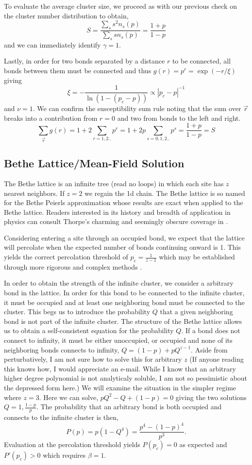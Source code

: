 To evaluate the average cluster size, we proceed as with our previous check on
the cluster number distribution to obtain,
\[S = \frac{\sum_s s^2n_s(p)}{\sum_s sn_s(p)} = \frac{1+p}{1-p}\]
and we can immediately identify $\gamma=1$.

Lastly, in order for two bonds separated by a distance $r$ to be connected, all
bonds between them must be connected and thus \(g(r) = p^r = \exp(-r/\xi)\) giving
\[\xi = -\frac{1}{\ln(1 - (p_c - p))}\propto |p_c - p|^{-1}\]
and $\nu = 1$.  We can confirm the susceptibility sum rule noting that the sum over
$\vec{r}$ breaks into a contribution from $r=0$ and two from bonds to the left and
right.
\[\sum_{\vec{r}}g(r) = 1 + 2\sum_{r=1,2..} p^r = 
1 + 2p\sum_{s=0,1,2..} p^s= \frac{1+p}{1-p} = S\]

\subsection{Bethe Lattice/Mean-Field Solution}

The Bethe lattice is an infinite tree (read no loops) in which each site has
$z$ nearest neighbors.  If $z=2$ we regain the 1d chain. The Bethe lattice is 
so named for the Bethe Peierls
approximation whose results are exact when applied to the Bethe lattice.
Readers interested in its history and breadth of application in physics
can consult Thorpe's charming and seemingly obscure coverage in \cite{Thorpe1982}.

Considering entering a site through an occupied bond, we expect that the lattice will
percolate when the expected number of bonds continuing onward is 1.  This yields the
correct percolation threshold of $p_c = \frac{1}{z-1}$ which may be established
through more rigorous and complex methods \cite{Fisher1961}.

In order to obtain the strength of the infinite cluster, we consider a arbitrary
bond in the lattice.  In order for this bond to be connected to the infinite
cluster, it must be occupied and at least one neighboring bond must be connected
to the cluster.  This begs us to introduce the probability $Q$ that a given neighboring
bond is not part of the infinite cluster.  The structure of the Bethe lattice allows us
to obtain a self-consistent equation for the probability $Q$.  If a bond does not
connect to infinity, it must be either unoccupied, or occupied and none of its
neighboring bonds connects to infinity, $Q = (1-p) + pQ^{z-1}$.  Aside from
perturbatively, I am not sure how to solve this for arbitrary $z$ (If anyone
reading this knows how, I would appreciate an e-mail. While I know that an arbitrary
higher degree polynomial is not analyticaly soluble, I am not so pessimistic about
the depressed form here.)  We will examine the situation in the
simpler regime where $z=3$.  Here we can solve, $pQ^2 - Q + (1-p) = 0$ giving the
two solutions $Q=1, \frac{1-p}{p}$. The probability that an arbitrary bond is both
occupied and connects to the infinite cluster is then,
\[P(p) = p(1-Q^4) = \frac{p^4-(1-p)^4}{p^3}.\]
Evaluation at the percolation threshold yields $P(p_c) = 0$ as expected and
$P'(p_c)>0$ which requires $\beta=1$.

